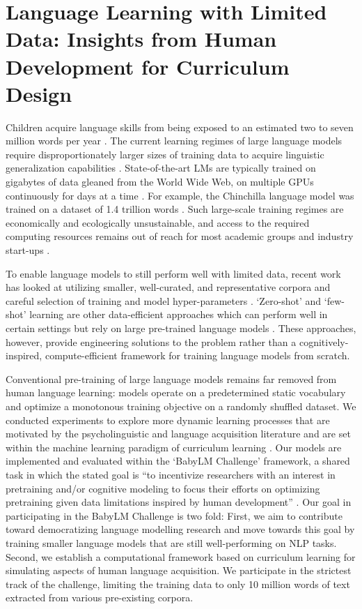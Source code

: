 \chapter{Language Learning with Limited Data: Insights from Human Development for Curriculum Design}
\label{chapter:CLIMB}

Children acquire language skills from being exposed to an estimated two to seven million words per year \citep{gilkerson2017mapping}. The current learning regimes of large language models require disproportionately larger sizes of training data to acquire linguistic generalization capabilities \citep{zhang2021need}. State-of-the-art LMs are typically trained on gigabytes of data gleaned from the World Wide Web, on multiple GPUs continuously for days at a time \cite{zhao2023llmsurvey}. For example, the Chinchilla language model was trained on a dataset of 1.4 trillion words \cite{hoffman2022chinchilla}. Such large-scale training regimes are economically and ecologically unsustainable, and access to the required computing resources remains out of reach for most academic groups and industry start-ups \cite{izsak2021train}.

To enable language models to still perform well with limited data, recent work has looked at utilizing smaller, well-curated, and representative corpora \citep{samuel2023ltgbert, gao2020pile} and careful selection of training and model hyper-parameters \citep{geiping2023cramming}. `Zero-shot' and `few-shot' learning are other data-efficient approaches which can perform well in certain settings but rely on large pre-trained language models \cite{brown2020gpt3,wei2021flan}.
These approaches, however, provide engineering solutions to the problem rather than a cognitively-inspired, compute-efficient framework for training language models from scratch.  

Conventional pre-training of large language models remains far removed from human language learning: models operate on a predetermined static vocabulary and optimize a monotonous training objective on a randomly shuffled dataset. We conducted experiments to explore more dynamic learning processes that are motivated by the psycholinguistic and language acquisition literature and are set within the machine learning paradigm of curriculum learning \cite{bengio2009curriculum}.
Our models are implemented and evaluated within the `BabyLM Challenge' framework, a shared task in which the stated goal is ``to incentivize researchers with an interest in pretraining and/or cognitive modeling to focus their efforts on optimizing pretraining given data limitations inspired by human development'' \cite{warstadt2023findings}. Our goal in participating in the BabyLM Challenge is two fold: First, we aim to contribute toward democratizing language modelling research and move towards this goal by training smaller language models that are still well-performing on NLP tasks. Second, we establish a computational framework based on curriculum learning for simulating aspects of human language acquisition. We participate in the strictest track of the challenge, limiting the training data to only 10 million words of text extracted from various pre-existing corpora. 


